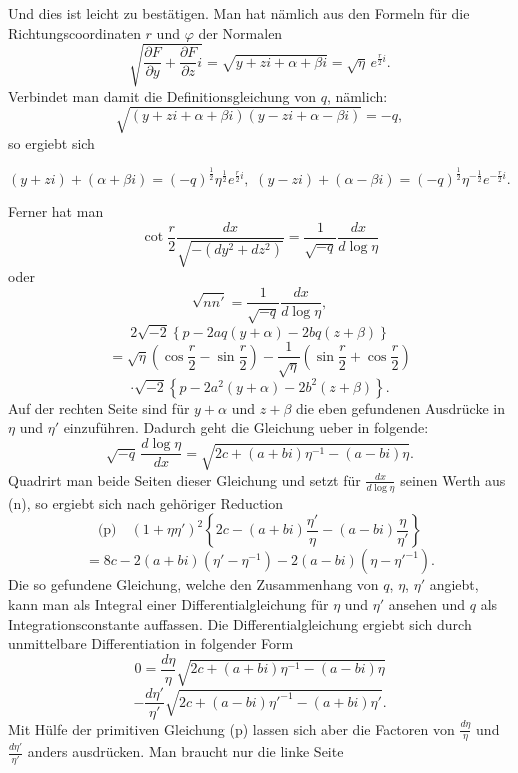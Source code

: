 \documentclass[12pt,a4paper]{article}
\begin{document}
Und dies ist leicht zu best\"atigen. Man hat n\"amlich aus den Formeln f\"ur die Richtungscoordinaten $r$ und $\varphi$ der Normalen
\[\sqrt{\frac{\partial F}{\partial y} + \frac{\partial F}{\partial z} i} = \sqrt{y + zi + \alpha + \beta i} = \sqrt{\eta}\, e^{\frac{r}{2}i}.\]
Verbindet man damit die Definitionsgleichung von $q$, n\"amlich:
\[\sqrt{(y + zi + \alpha + \beta i)(y - zi + \alpha - \beta i)} = -q,\]
so ergiebt sich

\newpage
\noindent $(y + zi) + (\alpha + \beta i) = (-q)^{\frac{1}{2}} \eta^{\frac{1}{2}} e^{\frac{r}{2}i},$
$(y - zi) + (\alpha - \beta i) = (-q)^{\frac{1}{2}} \eta^{-\frac{1}{2}} e^{-\frac{r}{2}i}.$

Ferner hat man
\[\cot\frac{r}{2} \frac{dx}{\sqrt{-(dy^{2} + dz^{2})}} = \frac{1}{\sqrt{-q}} \frac{dx}{d\log\eta}\]
oder
\[\sqrt{nn'} = \frac{1}{\sqrt{-q}} \frac{dx}{d\log\eta},\]
\[2\sqrt{-2}\left\{p - 2aq(y + \alpha) - 2bq(z + \beta)\right\}\]
\[= \sqrt{\eta}\left(\cos\frac{r}{2} - \sin\frac{r}{2}\right) - \frac{1}{\sqrt{\eta}}\left(\sin\frac{r}{2} + \cos\frac{r}{2}\right)\]
\[\cdot \sqrt{-2}\left\{p - 2a^{2}(y + \alpha) - 2b^{2}(z + \beta)\right\}.\]
Auf der rechten Seite sind f\"ur $y + \alpha$ und $z + \beta$ die eben gefundenen Ausdr\"ucke in $\eta$ und $\eta'$ einzuf\"uhren. Dadurch geht die Gleichung ueber in folgende:
\[\sqrt{-q}\, \frac{d\log\eta}{dx} = \sqrt{2c + (a+bi)\eta^{-1} - (a-bi)\eta}.\]
Quadrirt man beide Seiten dieser Gleichung und setzt f\"ur $\frac{dx}{d\log\eta}$ seinen Werth aus (n), so ergiebt sich nach geh\"origer Reduction
\[\text{(p)} \quad (1 + \eta\eta')^{2} \left\{2c - (a+bi)\frac{\eta'}{\eta} - (a-bi)\frac{\eta}{\eta'}\right\}\]
\[= 8c - 2(a+bi)(\eta' - \eta^{-1}) - 2(a-bi)(\eta - \eta'^{-1}).\]
Die so gefundene Gleichung, welche den Zusammenhang von $q$, $\eta$, $\eta'$ angiebt, kann man als Integral einer Differentialgleichung f\"ur $\eta$ und $\eta'$ ansehen und $q$ als Integrationsconstante auffassen. Die Differentialgleichung ergiebt sich durch unmittelbare Differentiation in folgender Form
\[0 = \frac{d\eta}{\eta} \sqrt{2c + (a+bi)\eta^{-1} - (a-bi)\eta}\]
\[- \frac{d\eta'}{\eta'} \sqrt{2c + (a-bi)\eta'^{-1} - (a+bi)\eta'}.\]
Mit H\"ulfe der primitiven Gleichung (p) lassen sich aber die Factoren von $\frac{d\eta}{\eta}$ und $\frac{d\eta'}{\eta'}$ anders ausdr\"ucken. Man braucht nur die linke Seite
\end{document}
